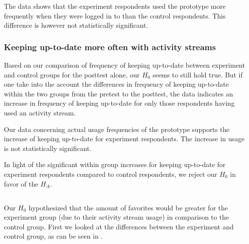 The data shows that the experiment respondents used the prototype more
frequently when they were logged in to \urort{} than the control respondents.
This difference is however not statistically significant.

\subsubsection{Keeping up-to-date more often with activity streams}

Based on our comparison of frequency of keeping up-to-date between experiment
and control groups for the posttest alone, our $H_0$ seems to still hold true.
But if one take into the account the differences in frequency of keeping
up-to-date within the two groups from the pretest to the posttest,
the data indicates an increase in frequency of keeping up-to-date for only
those respondents having used an activity stream.

Our data concerning actual usage frequencies of the prototype supports the
increase of keeping up-to-date for experiment respondents. The increase in
usage is not statistically significant.

In light of the significant within group increases for keeping up-to-date
for experiment respondents compared to control respondents,
we reject our $H_0$ in favor of the $H_A$.

\subsection{%
}

Our $H_0$ hypothesized that the amount of favorites would be greater for the
experiment group (due to their activity stream usage) in comparison to
the control group. First we looked at the differences
between the experiment and control group,
as can be seen in
.

